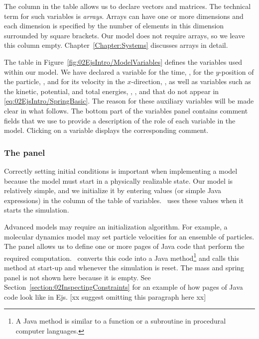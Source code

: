 The  column in the table allows us to declare vectors and matrices. The technical term for such
variables is \emph{arrays}. Arrays can have one or more dimensions and each dimension is specified by the number of
elements in this dimension surrounded by square brackets. Our model does not require arrays, so we leave this
column empty. Chapter~\ref{Chapter:Systems} discusses arrays in detail.

The table in Figure~\ref{fig:02EjsIntro/ModelVariables} defines the variables used within our model.  We have
declared a variable for the time, , for the $y$-position of the particle, , and for its velocity in the
$x$-direction, , as well as variables such as the kinetic, potential, and total energies, , ,
and  that do not appear in \eqref{eq:02EjsIntro/SpringBasic}. The reason for these auxiliary variables will be made
clear in what follows. The bottom part of the variables panel contains comment fields that we use to provide a
description of the role of each variable in the model. Clicking on a variable displays the corresponding comment.

\subsubsection{The  panel}

Correctly setting initial conditions is important when implementing a model because the model must start in a
physically realizable state. Our model is relatively simple, and we initialize it by entering values (or simple Java
expressions) in the  column of the table of variables. \ejs\ uses these values when it starts the
simulation.

Advanced models may require an initialization algorithm. For example, a molecular dynamics model may set particle
velocities for an ensemble of particles. The  panel allows us to define one or more pages of Java
code that perform the required computation. \ejs\ converts this code into a Java
method\footnote{A Java method is similar to a function or a subroutine in procedural computer languages.}
and calls this method at start-up and whenever the simulation is reset. The mass and spring  panel is not
shown here because it is empty. See Section~\ref{section:02InspectingConstraints} for an example of how
pages of Java code look like in Ejs. [xx suggest omitting this paragraph here xx]

